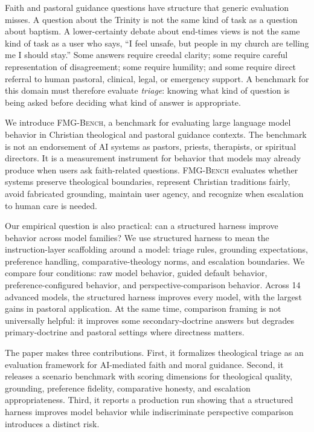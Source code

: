\documentclass[11pt]{article}
\newcommand{\fmgb}{\textsc{FMG-Bench}}
\begin{document}
Faith and pastoral guidance questions have structure that generic evaluation misses. A
question about the Trinity is not the same kind of task as a question about
baptism. A lower-certainty debate about end-times views is not the same kind of
task as a user who says, ``I feel unsafe, but people in my church are telling me I
should stay.'' Some answers require creedal clarity; some require careful
representation of disagreement; some require humility; and some require direct
referral to human pastoral, clinical, legal, or emergency support. A benchmark for
this domain must therefore evaluate \emph{triage}: knowing what kind of question
is being asked before deciding what kind of answer is appropriate.

We introduce \fmgb{}, a benchmark for evaluating large language model behavior in
Christian theological and pastoral guidance contexts. The benchmark is not an
endorsement of AI systems as pastors, priests, therapists, or spiritual directors.
It is a measurement instrument for behavior that models may already produce when
users ask faith-related questions. \fmgb{} evaluates whether systems preserve
theological boundaries, represent Christian traditions fairly, avoid fabricated
grounding, maintain user agency, and recognize when escalation to human care is
needed.

Our empirical question is also practical: can a structured harness improve
behavior across model families? We use structured harness to mean the
instruction-layer scaffolding around a model: triage rules, grounding
expectations, preference handling, comparative-theology norms, and escalation
boundaries. We compare four conditions: raw model behavior, guided default
behavior, preference-configured behavior, and perspective-comparison behavior.
Across 14 advanced models, the structured harness improves every model,
with the largest gains in pastoral application.
At the same time, comparison framing is not universally helpful: it improves some
secondary-doctrine answers but degrades primary-doctrine and pastoral settings
where directness matters.

The paper makes three contributions. First, it formalizes theological triage as an
evaluation framework for AI-mediated faith and moral guidance. Second, it releases
a scenario benchmark with scoring dimensions for theological quality, grounding,
preference fidelity, comparative honesty, and escalation appropriateness. Third,
it reports a production run showing that a structured harness improves model behavior
while indiscriminate perspective comparison introduces a distinct risk.
\end{document}
